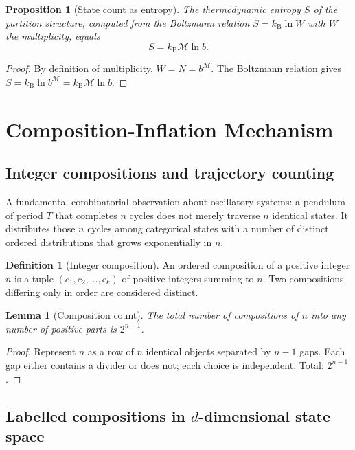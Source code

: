 \documentclass[11pt,twocolumn,a4paper]{article}
\newtheorem{lemma}[theorem]{Lemma}
\newtheorem{proposition}[theorem]{Proposition}
\theoremstyle{definition}
\newtheorem{definition}[theorem]{Definition}
\theoremstyle{remark}
\newcommand{\kB}{k_{\mathrm{B}}}
\newcommand{\Mop}{\mathcal{M}}
\begin{document}
\begin{proposition}[State count as entropy]\label{prop:entropy}
The thermodynamic entropy $S$ of the partition structure, computed from the Boltzmann relation $S = \kB \ln W$ with $W$ the multiplicity, equals
\begin{equation}
S = \kB \Mop \ln b.
\end{equation}
\end{proposition}

\begin{proof}
By definition of multiplicity, $W = N = b^\Mop$. The Boltzmann relation gives $S = \kB \ln b^\Mop = \kB \Mop \ln b$.
\end{proof}

\section{Composition-Inflation Mechanism}
\label{sec:inflation}

\subsection{Integer compositions and trajectory counting}

A fundamental combinatorial observation about oscillatory systems: a pendulum of period $T$ that completes $n$ cycles does not merely traverse $n$ identical states. It distributes those $n$ cycles among categorical states with a number of distinct ordered distributions that grows exponentially in $n$.

\begin{definition}[Integer composition]
An ordered composition of a positive integer $n$ is a tuple $(c_1, c_2, \ldots, c_k)$ of positive integers summing to $n$. Two compositions differing only in order are considered distinct.
\end{definition}

\begin{lemma}[Composition count]
The total number of compositions of $n$ into any number of positive parts is $2^{n-1}$.
\end{lemma}

\begin{proof}
Represent $n$ as a row of $n$ identical objects separated by $n-1$ gaps. Each gap either contains a divider or does not; each choice is independent. Total: $2^{n-1}$.
\end{proof}

\subsection{Labelled compositions in $d$-dimensional state space}
\end{document}
